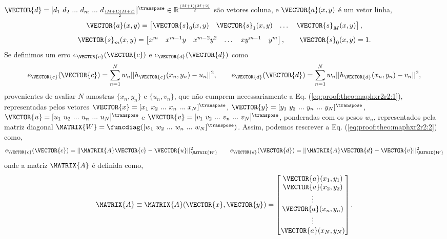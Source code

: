 \begin{myproofT}
$\VECTOR{d}=[d_1~ d_2~ ...~ d_m~ ...~ d_{\frac{(M+1)(M+2)}{2}}]^{\transpose} \in \mathbb{R}^{\frac{(M+1)(M+2)}{2}}$ 
são vetores coluna, e
$\VECTOR{a}(x,y)$ é um vetor linha,
\begin{equation}
\VECTOR{a}(x,y)= 
\begin{bmatrix}
\VECTOR{s}_{0}(x,y) & \VECTOR{s}_{1}(x,y) &  \dots  & \VECTOR{s}_{M}(x,y)
\end{bmatrix},
\end{equation}
\begin{equation}
\VECTOR{s}_{m}(x,y)=
\begin{bmatrix}
x^m  & x^{m-1} y  & x^{m-2} y^2    & \dots  & x y^{m-1} &  y^m 
\end{bmatrix},
\qquad
\VECTOR{s}_{0}(x,y)=1.
\end{equation}
Se definimos um erro $e_{\VECTOR{c}}(\VECTOR{c})$ e $e_{\VECTOR{d}}(\VECTOR{d})$ como
\begin{equation}\label{eq:proof:theo:maphxr2r2:2}
e_{\VECTOR{c}}(\VECTOR{c}) 
=  
\sum_{n=1}^{N} w_n||h_{\VECTOR{c}}(x_n,y_n)-u_n||^2,
\qquad
e_{\VECTOR{d}}(\VECTOR{d}) 
=  
\sum_{n=1}^{N} w_n||h_{\VECTOR{d}}(x_n,y_n)-v_n||^2,
\end{equation}
provenientes de avaliar $N$ amostras $\{x_n,y_n\}$ e $\{u_n,v_n\}$, 
que não cumprem necessariamente a Eq. (\ref{eq:proof:theo:maphxr2r2:1}), 
representadas pelos vetores 
$\VECTOR{x}=[x_1~ x_2~ ...~ x_n~ ...~ x_N]^{\transpose}$,
$\VECTOR{y}=[y_1~ y_2~ ...~ y_n~ ...~ y_N]^{\transpose}$, 
$\VECTOR{u}=[u_1~ u_2~ ...~ u_n~ ...~ u_N]^{\transpose}$ e
$\VECTOR{v}=[v_1~ v_2~ ...~ v_n~ ...~ v_N]^{\transpose}$,
ponderadas com os pesos $w_n$, representados pela matriz diagonal $\MATRIX{W}=\funcdiag([w_1~ w_2~ ...~ w_n~ ...~ w_N]^{\transpose})$.
Assim, podemos rescrever a Eq. (\ref{eq:proof:theo:maphxr2r2:2}) como,
\begin{equation}\label{eq:proof:theo:maphxr2r2:3}
e_{\VECTOR{c}}(\VECTOR{c}) = ||\MATRIX{A}\VECTOR{c}-\VECTOR{u}||_{\MATRIX{W}}^2 
\qquad
e_{\VECTOR{d}}(\VECTOR{d}) = ||\MATRIX{A}\VECTOR{d}-\VECTOR{v}||_{\MATRIX{W}}^2 
\end{equation}
onde a matriz $\MATRIX{A}$ é definida como,
\begin{equation}\label{eq:proof:maphxr2r2:4}
\MATRIX{A}\equiv \MATRIX{A}(\VECTOR{x},\VECTOR{y})=\begin{bmatrix}
\VECTOR{a}(x_1,y_1)\\
\VECTOR{a}(x_2,y_2)\\
\vdots\\
\VECTOR{a}(x_n,y_n)\\
\vdots\\
\VECTOR{a}(x_N,y_N)
\end{bmatrix}.
\end{equation}



\end{myproofT}
